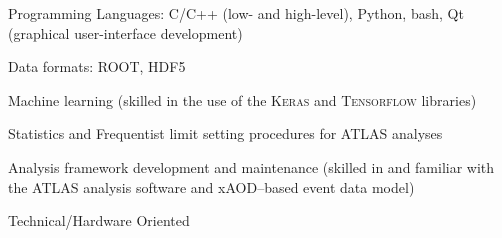 \hspace{0.2in}
\begin{minipage}{0.8\textwidth}

    \vspace{0.1in}
    \hspace{0.15in}
    \begin{minipage}{\textwidth}
    Programming Languages: C/C++ (low- and high-level), Python, bash, Qt (graphical user-interface development)
    \end{minipage}


    \vspace{0.1in}
    \hspace{0.15in}
    \begin{minipage}{\textwidth}
    Data formats: ROOT, HDF5
    \end{minipage}

    \vspace{0.1in}
	\hspace{0.15in}
	\begin{minipage}{\textwidth}
	Machine learning (skilled in the use of the \textsc{Keras} and \textsc{Tensorflow} libraries)
    \end{minipage}

	\vspace{0.1in}
	\hspace{0.15in}
    \begin{minipage}{\textwidth}
	Statistics and Frequentist limit setting procedures for ATLAS analyses
    \end{minipage}

	\vspace{0.1in}
	\hspace{0.15in}
    \begin{minipage}{\textwidth}
	Analysis framework development and maintenance (skilled in and familiar with the ATLAS analysis software and xAOD--based event data model)
    \end{minipage}

    \vspace{0.1in}
    \hspace{0.15in}
    \begin{minipage}{\textwidth}
    \end{minipage}

\end{minipage}

\hspace{0.2in}
Technical/Hardware Oriented

